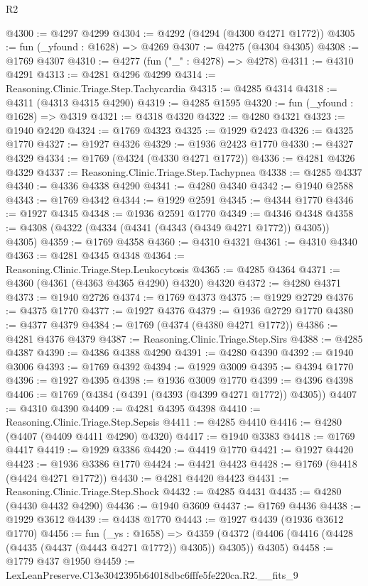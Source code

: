 \begin{lexlean}{R2}
\begin{coremodule}
@4300 := @4297 @4299
@4304 := @4292 (@4294 (@4300 @4271 @1772))
@4305 := fun (_yfound : @1628) => @4269
@4307 := @4275 (@4304 @4305)
@4308 := @1769 @4307
@4310 := @4277 (fun ("_" : @4278) => @4278)
@4311 := @4310 @4291
@4313 := @4281 @4296 @4299
@4314 := Reasoning.Clinic.Triage.Step.Tachycardia
@4315 := @4285 @4314
@4318 := @4311 (@4313 @4315 @4290)
@4319 := @4285 @1595
@4320 := fun (_yfound : @1628) => @4319
@4321 := @4318 @4320
@4322 := @4280 @4321
@4323 := @1940 @2420
@4324 := @1769 @4323
@4325 := @1929 @2423
@4326 := @4325 @1770
@4327 := @1927 @4326
@4329 := @1936 @2423 @1770
@4330 := @4327 @4329
@4334 := @1769 (@4324 (@4330 @4271 @1772))
@4336 := @4281 @4326 @4329
@4337 := Reasoning.Clinic.Triage.Step.Tachypnea
@4338 := @4285 @4337
@4340 := @4336 @4338 @4290
@4341 := @4280 @4340
@4342 := @1940 @2588
@4343 := @1769 @4342
@4344 := @1929 @2591
@4345 := @4344 @1770
@4346 := @1927 @4345
@4348 := @1936 @2591 @1770
@4349 := @4346 @4348
@4358 := @4308 (@4322 (@4334 (@4341 (@4343 (@4349 @4271 @1772)) @4305)) @4305)
@4359 := @1769 @4358
@4360 := @4310 @4321
@4361 := @4310 @4340
@4363 := @4281 @4345 @4348
@4364 := Reasoning.Clinic.Triage.Step.Leukocytosis
@4365 := @4285 @4364
@4371 := @4360 (@4361 (@4363 @4365 @4290) @4320) @4320
@4372 := @4280 @4371
@4373 := @1940 @2726
@4374 := @1769 @4373
@4375 := @1929 @2729
@4376 := @4375 @1770
@4377 := @1927 @4376
@4379 := @1936 @2729 @1770
@4380 := @4377 @4379
@4384 := @1769 (@4374 (@4380 @4271 @1772))
@4386 := @4281 @4376 @4379
@4387 := Reasoning.Clinic.Triage.Step.Sirs
@4388 := @4285 @4387
@4390 := @4386 @4388 @4290
@4391 := @4280 @4390
@4392 := @1940 @3006
@4393 := @1769 @4392
@4394 := @1929 @3009
@4395 := @4394 @1770
@4396 := @1927 @4395
@4398 := @1936 @3009 @1770
@4399 := @4396 @4398
@4406 := @1769 (@4384 (@4391 (@4393 (@4399 @4271 @1772)) @4305))
@4407 := @4310 @4390
@4409 := @4281 @4395 @4398
@4410 := Reasoning.Clinic.Triage.Step.Sepsis
@4411 := @4285 @4410
@4416 := @4280 (@4407 (@4409 @4411 @4290) @4320)
@4417 := @1940 @3383
@4418 := @1769 @4417
@4419 := @1929 @3386
@4420 := @4419 @1770
@4421 := @1927 @4420
@4423 := @1936 @3386 @1770
@4424 := @4421 @4423
@4428 := @1769 (@4418 (@4424 @4271 @1772))
@4430 := @4281 @4420 @4423
@4431 := Reasoning.Clinic.Triage.Step.Shock
@4432 := @4285 @4431
@4435 := @4280 (@4430 @4432 @4290)
@4436 := @1940 @3609
@4437 := @1769 @4436
@4438 := @1929 @3612
@4439 := @4438 @1770
@4443 := @1927 @4439 (@1936 @3612 @1770)
@4456 := fun (_ys : @1658) =>
  @4359 (@4372 (@4406 (@4416 (@4428 (@4435 (@4437 (@4443 @4271 @1772)) @4305)) @4305)) @4305)
@4458 := @1779 @437 @1950
@4459 := LexLeanPreserve.C13e3042395b64018dbc6fffe5fe220ca.R2.__fits_9

\end{coremodule}
\end{lexlean}
